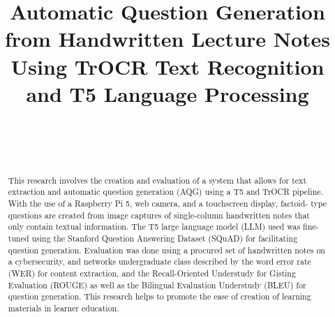 \documentclass[conference]{IEEEtran}
\begin{document}
\title{Automatic Question Generation from Handwritten Lecture Notes Using TrOCR Text Recognition 
and T5 Language Processing}
\author{
~\\
\and
{}
~\\
\and
{}
}


\maketitle

\begin{abstract}
    This research involves the creation and evaluation of a system that allows 
    for text extraction and automatic question generation (AQG) using a 
    T5 and TrOCR pipeline. With the use of a Raspberry Pi 5, web camera, and a touchscreen display, factoid-
    type questions are created from image captures of single-column handwritten notes that only contain textual information. The 
    T5 large language model (LLM) used was fine-tuned using the 
    Stanford Question Answering Dataset (SQuAD) for facilitating question 
    generation. Evaluation was done using a procured 
    set of handwritten notes on a cybersecurity, and networks undergraduate class described by the word 
    error rate (WER) for content extraction, and the Recall-Oriented Understudy for Gisting Evaluation (ROUGE) as well as the Bilingual Evaluation Understudy (BLEU) for question generation. This research helps to promote the ease of creation of learning materials in learner education.
\end{abstract}
\end{document}
